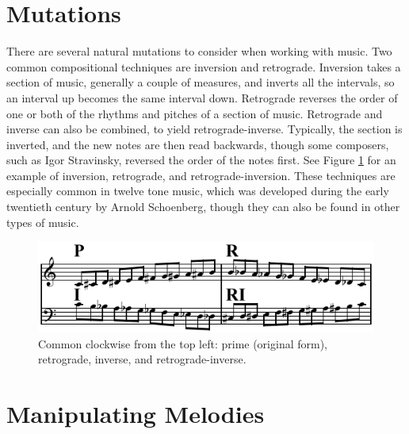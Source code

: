 \section{Mutations} \label{ga:mutate}

There are several natural mutations to consider when working with music.
Two common compositional techniques are inversion and retrograde.
Inversion takes a section of music, generally a couple of measures, and inverts all the intervals, so an interval up becomes the same interval down.
Retrograde reverses the order of one or both of the rhythms and pitches of a section of music.
Retrograde and inverse can also be combined, to yield retrograde-inverse.
Typically, the section is inverted, and the new notes are then read backwards, though some composers, such as Igor Stravinsky, reversed the order of the notes first.
See Figure \ref{fig:p-r-i-ri} for an example of inversion, retrograde, and retrograde-inversion.
These techniques are especially common in twelve tone music, which was developed during the early twentieth century by Arnold Schoenberg, though they can also be found in other types of music. %

\begin{figure}
	\centering
	\includegraphics[width=\linewidth]{figures/P-R-I-RI.png} %
	\caption{Common  clockwise from the top left: prime (original form), retrograde, inverse, and retrograde-inverse.}
	\label{fig:p-r-i-ri}
\end{figure}

\section{Manipulating Melodies} \label{ga:manip}


